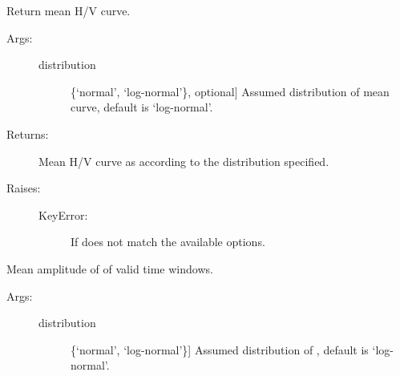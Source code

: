 \documentclass[letterpaper,10pt,english,openany,oneside]{sphinxmanual}
\begin{document}
\begin{fulllineitems}
\begin{fulllineitems}
\begin{description}
\end{description}

\end{fulllineitems}


\begin{fulllineitems}
\label{\detokenize{index:hvsrpy.Hvsr.mean_curve}}
Return mean H/V curve.
\begin{description}
\item[{Args:}] \leavevmode\begin{description}
\item[{distribution}] \leavevmode{[}\{‘normal’, ‘log-normal’\}, optional{]}
Assumed distribution of mean curve, default is 
‘log-normal’.

\end{description}

\item[{Returns:}] \leavevmode
Mean H/V curve as  according to the distribution
specified.

\item[{Raises:}] \leavevmode\begin{description}
\item[{KeyError:}] \leavevmode
If  does not match the available options.

\end{description}

\end{description}

\end{fulllineitems}


\begin{fulllineitems}
\label{\detokenize{index:hvsrpy.Hvsr.mean_f0_amp}}
Mean amplitude of  of valid time windows.
\begin{description}
\item[{Args:}] \leavevmode\begin{description}
\item[{distribution}] \leavevmode{[}\{‘normal’, ‘log-normal’\}{]}
Assumed distribution of , default is ‘log-normal’.


\end{description}
\end{description}
\end{fulllineitems}
\end{fulllineitems}
\end{document}
